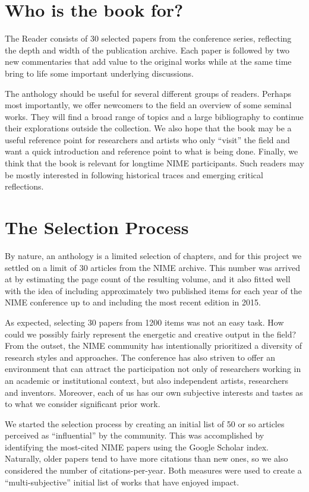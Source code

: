 \section*{Who is the book for?}

The Reader consists of 30 selected papers from the conference series, reflecting the depth and width of the publication archive. Each paper is followed by two new commentaries that add value to the original works while at the same time bring to life some important underlying discussions. 

The anthology should be useful for several different groups of readers. Perhaps most importantly, we offer newcomers to the field an overview of some seminal works. They will find a broad range of topics and a large bibliography to continue their explorations outside the collection. We also hope that the book may be a useful reference point for researchers and artists who only ``visit'' the field and want a quick introduction and reference point to what is being done. Finally, we think that the book is relevant for longtime NIME participants. Such readers may be mostly interested in following historical traces and emerging critical reflections. 


\section*{The Selection Process}

By nature, an anthology is a limited selection of chapters, and for this project we settled on a limit of 30 articles from the NIME archive. This number was arrived at by estimating the page count of the resulting volume, and it also fitted well with the idea of including approximately two published items for each year of the NIME conference up to and including the most recent edition in 2015. 

As expected, selecting 30 papers from 1200 items was not an easy task. How could we possibly fairly represent the energetic and creative output in the field? From the outset, the NIME community has intentionally prioritized a diversity of research styles and approaches. The conference has also striven to offer an environment that can attract the participation not only of researchers working in an academic or institutional context, but also independent artists, researchers and inventors. Moreover, each of us has our own subjective interests and tastes as to what we consider significant prior work.

We started the selection process by creating an initial list of 50 or so articles perceived as ``influential'' by the community. This was accomplished by identifying the most-cited NIME papers using the Google Scholar index. Naturally, older papers tend to have more citations than new ones, so we also considered the number of citations-per-year. Both measures were used to create a ``multi-subjective'' initial list of works that have enjoyed impact.

